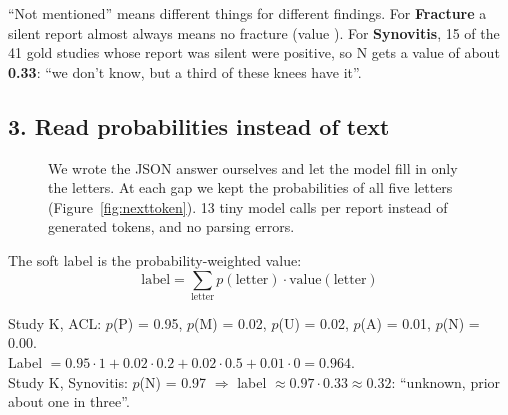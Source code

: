 \begin{example}
``Not mentioned'' means different things for different findings. For \textbf{Fracture} a silent report almost
always means no fracture (value ). For \textbf{Synovitis}, 15 of the 41 gold studies whose report was silent
were positive, so N gets a value of about \textbf{0.33}: ``we don't know, but a third of these knees have it''.
\end{example}

\subsection*{3. Read probabilities instead of text}

\begin{figure}[H]
\centering
{}
\caption{We wrote the JSON answer ourselves and let the model fill in only the letters. At each gap we kept the
probabilities of all five letters (Figure~\ref{fig:nexttoken}). 13 tiny model calls per report instead of
 generated tokens, and no parsing errors.}
\label{fig:prefill}
\end{figure}

The soft label is the probability-weighted value:
\[
\text{label} = \sum_{\text{letter}} p(\text{letter}) \cdot \text{value}(\text{letter})
\]

\begin{example}
Study K, ACL: $p$(P) = 0.95, $p$(M) = 0.02, $p$(U) = 0.02, $p$(A) = 0.01, $p$(N) = 0.00. \\
Label $= 0.95\cdot1 + 0.02\cdot0.2 + 0.02\cdot0.5 + 0.01\cdot0 = \mathbf{0.964}$. \\
Study K, Synovitis: $p$(N) = 0.97 $\Rightarrow$ label $\approx 0.97 \cdot 0.33 \approx \mathbf{0.32}$: ``unknown, prior
about one in three''.
\end{example}


